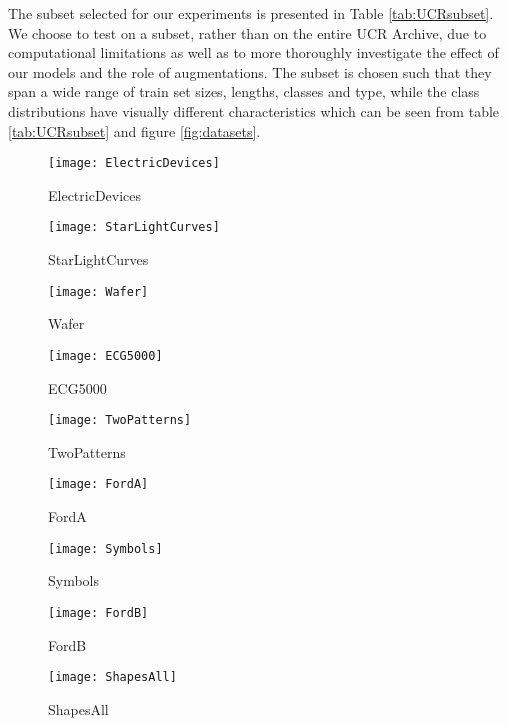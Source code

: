 \documentclass[../../thesis.tex]{subfiles}
\begin{document}
The subset selected for our experiments is presented in Table \ref{tab:UCRsubset}. We choose to test on a subset, rather than on the entire UCR Archive, due to computational limitations as well as to more thoroughly investigate the effect of our models and the role of augmentations. The subset is chosen such that they span a wide range of train set sizes, lengths, classes and type, while the class distributions have visually different characteristics which can be seen from table \ref{tab:UCRsubset} and figure \ref{fig:datasets}.

\begin{figure}[h]
    \centering
    \begin{minipage}[b]{0.32\textwidth}
        \centering
        \texttt{[image: ElectricDevices]}
        \caption*{ElectricDevices}
    \end{minipage}
    \hfill
    \begin{minipage}[b]{0.32\textwidth}
        \centering
        \texttt{[image: StarLightCurves]}
        \caption*{StarLightCurves}
    \end{minipage}
    \hfill
    \begin{minipage}[b]{0.32\textwidth}
        \centering
        \texttt{[image: Wafer]}
        \caption*{Wafer}
    \end{minipage}
    
    \vspace{0.4cm}
    
    \begin{minipage}[b]{0.32\textwidth}
        \centering
        \texttt{[image: ECG5000]}
        \caption*{ECG5000}
    \end{minipage}
    \hfill
    \begin{minipage}[b]{0.32\textwidth}
        \centering
        \texttt{[image: TwoPatterns]}
        \caption*{TwoPatterns}
    \end{minipage}
    \hfill
    \begin{minipage}[b]{0.32\textwidth}
        \centering
        \texttt{[image: FordA]}
        \caption*{FordA}
    \end{minipage}
    
    \vspace{0.4cm}
    
    \begin{minipage}[b]{0.32\textwidth}
        \centering
        \texttt{[image: Symbols]}
        \caption*{Symbols}
    \end{minipage}
    \hfill
    \begin{minipage}[b]{0.32\textwidth}
        \centering
        \texttt{[image: FordB]}
        \caption*{FordB}
    \end{minipage}
    \hfill
    \begin{minipage}[b]{0.32\textwidth}
        \centering
        \texttt{[image: ShapesAll]}
        \caption*{ShapesAll}
    \end{minipage}
    

\end{figure}
\end{document}
